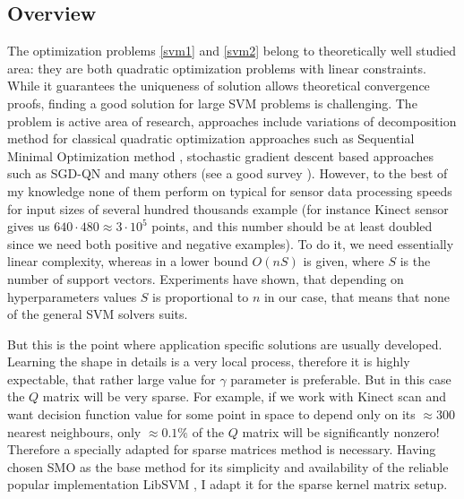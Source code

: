 \subsection{Overview}

The optimization problems \ref{svm1} and \ref{svm2} belong to theoretically well studied area: they are both quadratic optimization problems with linear constraints. While it guarantees the uniqueness of solution allows theoretical convergence proofs, finding a good solution for large SVM problems is challenging. The problem is active area of research, approaches include variations of decomposition method for classical quadratic optimization approaches such as Sequential Minimal Optimization method \cite{SMOplatt}, stochastic gradient descent based approaches such as SGD-QN \cite{bordes2009sgd} and many others (see a good survey \cite{largeSVM}). However, to the best of my knowledge none of them perform on typical for sensor data processing speeds for input sizes of several hundred thousands example (for instance Kinect sensor gives us $640 \cdot 480 \approx 3 \cdot 10^5$ points, and this number should be at least doubled since we need both positive and negative examples). To do it, we need essentially linear complexity, whereas in \cite{bordes2005fast} a lower bound $O(nS)$ is given, where $S$ is the number of support vectors. Experiments have shown, that depending on hyperparameters values $S$ is proportional to $n$ in our case, that means that none of the general SVM solvers suits.

But this is the point where application specific solutions are usually developed. Learning the shape in details is a very local process, therefore it is highly expectable, that rather large value for $\gamma$ parameter is preferable. But in this case the $Q$ matrix will be very sparse. For example, if we work with Kinect scan and want decision function value for some point in space to depend only on its $\approx 300$ nearest neighbours, only $\approx 0.1\%$ of the $Q$ matrix will be significantly nonzero! Therefore a specially adapted for sparse matrices method is necessary. Having chosen SMO as the base method for its simplicity and availability of the reliable popular implementation LibSVM \cite{chang2011libsvm}, I adapt it for the sparse kernel matrix setup.

